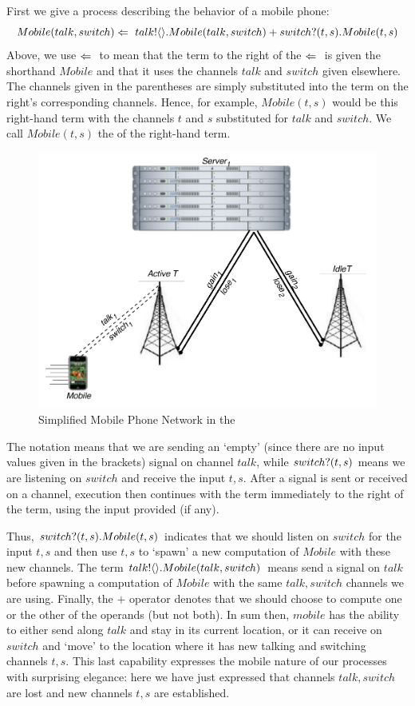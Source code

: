 	First we give a process describing the behavior of a mobile phone:
	\[
		Mobile(talk, switch) \Leftarrow\  {talk}!\langle{}\rangle. Mobile(talk,switch) + {switch}?({t,s}). Mobile(t,s)
	\]
	Above, we use $\Leftarrow\ $ to mean that the term to the right of the $\Leftarrow\ $ is given the shorthand $Mobile$ and that it uses the channels $talk$ and $switch$ given elsewhere.  
The channels given in the parentheses are simply substituted into the term on the right's corresponding channels.  
Hence, for example, $Mobile(t,s)$ would be this right-hand term with the channels $t$ and $s$ substituted for $talk$ and $switch$. 
We call $Mobile(t,s)$ the  of the right-hand term.
	\begin{figure}[H]
	\centering
	\includegraphics[scale=0.7]{figures/cell_network_pi.pdf} %
	\caption{Simplified Mobile Phone Network in the \picalc}
	\label{fig_cell_network_pi}
	\end{figure}
	The notation  means that we are sending an `empty' (since there are no input values given in the brackets) signal on channel $talk$, while ${switch}?({t,s})$ means we are listening on $switch$ and receive the input $t,s$.  
After a signal is sent or received on a channel, execution then continues with the term immediately to the right of the term, using the input provided (if any).  

	
	Thus, ${switch}?({t,s}). Mobile(t,s)$ indicates that we should listen on $switch$ for the input $t,s$ and then use $t,s$ to `spawn' a new computation of $Mobile$ with these new channels. 
	The term ${talk}!\langle{}\rangle. Mobile(talk,switch)$ means send a signal on $talk$ before spawning a computation of $Mobile$ with the same $talk,switch$ channels we are using.  
Finally, the $+$ operator denotes that we should choose to compute one or the other of the operands (but not both).  
In sum then, $mobile$ has the ability to either send along $talk$ and stay in its current location, or it can receive on $switch$ and `move' to the location where it has new talking and switching channels $t,s$.  
This last capability expresses the mobile nature of our processes with surprising elegance: here we have just expressed that channels $talk,switch$ are lost and new channels $t,s$ are established.
	
